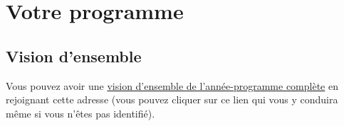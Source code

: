 % 
% 
% 
% 
% 
% 
% 
% 

\chapter{Votre programme}\hypertarget{votre-programme}{}\label{votre-programme}

\section{Vision d'ensemble}\hypertarget{vision-densemble}{}\label{vision-densemble}

Vous pouvez avoir une \href{\route{abs\_pday/cal?in=unan/program}}{vision d'ensemble de l'année-programme complète} en rejoignant cette adresse (vous pouvez cliquer sur ce lien qui vous y conduira même si vous n'êtes pas identifié).

